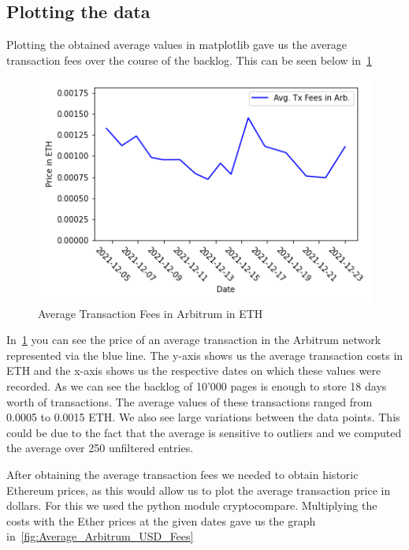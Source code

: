 \documentclass[a4paper,oneside,openright,11pt]{report}
\begin{document}
	\subsection{Plotting the data}
	Plotting the obtained average values in matplotlib gave us the average transaction fees over the course of the backlog.
	This can be seen below in~\cref{fig:Average_Arbitrum_Ether_Fees}
	
	\begin{figure}[h]
		\centering
		\includegraphics[scale=0.8]{./Pictures/arb_avg_eth1.png}
		\caption{Average Transaction Fees in Arbitrum in ETH}
		\label{fig:Average_Arbitrum_Ether_Fees}
	\end{figure}
	
	In~\cref{fig:Average_Arbitrum_Ether_Fees} you can see the price of an average transaction in the Arbitrum 
	network represented via the blue line. The y-axis shows us the average transaction costs in ETH and the x-axis
	shows us the respective dates on which these values were recorded. As we can see the backlog of 10'000 pages
	is enough to store 18 days worth of transactions. The average values of these transactions ranged from 
	0.0005 to 0.0015 ETH. We also see large variations between the data points. This could be due to the fact that the
	average is sensitive to outliers and we computed the average over 250 unfiltered entries.
	
	After obtaining the average transaction fees we needed to obtain historic Ethereum prices, as this would allow us 
	to plot the average transaction price in dollars. For this we used the python module cryptocompare. 
	Multiplying the costs with the Ether prices at the given dates gave us the graph 
	in~\cref{fig:Average_Arbitrum_USD_Fees}
	
\end{document}
